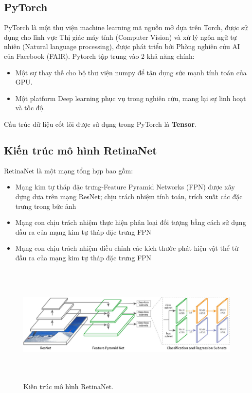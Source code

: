 \documentclass[a4paper, 12pt]{report}
\begin{document}
\subsection{PyTorch}
PyTorch là một thư viện machine learning mã nguồn mở dựa trên Torch, được sử dụng cho lĩnh vực Thị giác máy tính (Computer Vision) và xử lý ngôn ngữ tự nhiên (Natural language processing), được phát triển bởi Phòng nghiên cứu AI của Facebook (FAIR). Pytorch tập trung vào 2 khả năng chính:
\begin{itemize}
	\item Một sự thay thế cho bộ thư viện numpy để tận dụng sức mạnh tính toán của GPU.
	\item Một platform Deep learning phục vụ trong nghiên cứu, mang lại sự linh hoạt và tốc độ.
\end{itemize}
Cấu trúc dữ liệu cốt lõi được sử dụng trong PyTorch là \textbf{Tensor}.\par

\subsection{Kiến trúc mô hình RetinaNet}
RetinaNet là một mạng tổng hợp bao gồm:
\begin{itemize}
	\item Mạng kim tự tháp đặc trưng-Feature Pyramid Networks (FPN) được xây dựng dưa trên mạng ResNet; chịu trách nhiệm tính toán,  trích xuất các đặc trưng trong bức ảnh
	\item Mạng con chịu trách nhiệm thực hiện phân loại đối tượng bằng cách sử dụng đầu ra của mạng kim tự tháp đặc trưng FPN
	\item Mạng con chịu trách nhiệm điều chỉnh các kích thước phát hiện vật thể từ đầu ra của mạng kim tự tháp đặc trưng FPN
\end{itemize}
\begin{figure}[!h]
	\centering
	\includegraphics[width=12cm,height=6cm]{Images/resnet_visulize}
	\caption{Kiến trúc mô hình RetinaNet.}
	\label{fig:resnet-fpn4}
\end{figure}
\end{document}
